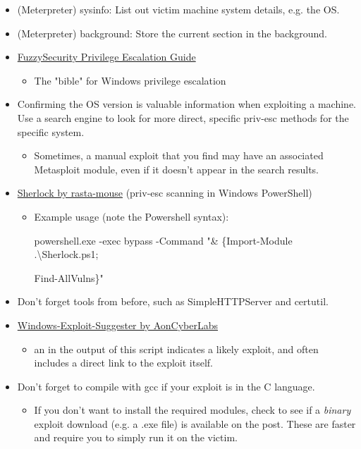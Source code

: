 \documentclass[a4paper,11pt]{article}
\renewcommand{\tt}[2][tt]{\textcolor{#1}{\ttfamily #2}}%
\begin{document}
\begin{itemize}
    \item (Meterpreter) \tt{sysinfo}: List out victim machine system details, e.g. the OS.
    \item (Meterpreter) \tt{background}: {Store the current section in the background.}
    \item \href{https://www.fuzzysecurity.com/tutorials/16.html}{FuzzySecurity Privilege Escalation Guide}
    \begin{itemize}
        \item The "bible" for Windows privilege escalation
    \end{itemize}
    \item Confirming the OS version is valuable information when exploiting a machine. Use a search engine to look for more direct, specific priv-esc methods for the specific system.
    \begin{itemize}
        \item Sometimes, a manual exploit that you find may have an associated Metasploit module, even if it doesn't appear in the search results.
    \end{itemize}
    \item \href{https://github.com/rasta-mouse/Sherlock}{Sherlock by rasta-mouse} (priv-esc scanning in Windows PowerShell)
    \begin{itemize}
        \item Example usage (note the Powershell syntax):
        
        \tt{powershell.exe -exec bypass -Command "\& \{Import-Module .\textbackslash Sherlock.ps1;}
        
        \tt{Find-AllVulns\}"}
    \end{itemize}
    \item Don't forget tools from before, such as \tt{SimpleHTTPServer} and \tt{certutil}.
    \item \href{https://github.com/rasta-mouse/Sherlock/blob/master/Sherlock.ps1}{Windows-Exploit-Suggester by AonCyberLabs}
    \begin{itemize}
        \item an \tt{[E]} in the output of this script indicates a likely exploit, and often includes a direct link to the exploit itself.
    \end{itemize}
    \item Don't forget to compile with \tt{gcc} if your exploit is in the C language. 
    \begin{itemize}
        \item If you don't want to install the required modules, check to see if a \textit{binary} exploit download (e.g. a \tt{.exe} file) is available on the post. These are faster and require you to simply run it on the victim.
    \end{itemize}
\end{itemize}
\pagebreak
\end{document}
